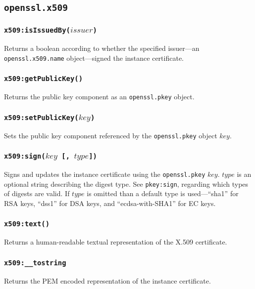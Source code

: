 \documentclass[11pt, oneside]{memoir}
\newcommand*{\fn}[1]{\texttt{#1}\xspace}
\newcommand*{\module}[1]{\texttt{#1}\xspace}
\newcounter{toccols}
\newenvironment{Module}[1]{
	\subsection{\texttt{#1}}
	\addtocontents{toc}{
		\protect\begin{multicols}{\value{toccols}}
	}
}{
	\addtocontents{toc}{\protect\end{multicols}}
}
\begin{document}
\begin{Module}{openssl.x509}
\subsubsection[\fn{x509:isIssuedBy}]{\fn{x509:isIssuedBy($issuer$)}}

Returns a boolean according to whether the specified issuer---an \module{openssl.x509.name} object---signed the instance certificate.

\subsubsection[\fn{x509:getPublicKey}]{\fn{x509:getPublicKey()}}

Returns the public key component as an \module{openssl.pkey} object.

\subsubsection[\fn{x509:setPublicKey}]{\fn{x509:setPublicKey($key$)}}

Sets the public key component referenced by the \module{openssl.pkey} object $key$.

\subsubsection[\fn{x509:sign}]{\fn{x509:sign($key$ [, $type$])}}

Signs and updates the instance certificate using the \module{openssl.pkey} $key$. $type$ is an optional string describing the digest type. See \module{pkey:sign}, regarding which types of digests are valid. If $type$ is omitted than a default type is used---``sha1'' for RSA keys, ``dss1'' for DSA keys, and ``ecdsa-with-SHA1'' for EC keys.

\subsubsection[\fn{x509:text}]{\fn{x509:text()}}

Returns a human-readable textual representation of the X.509 certificate.

\subsubsection[\fn{x509:\_\_tostring}]{\fn{x509:\_\_tostring}}

Returns the PEM encoded representation of the instance certificate.

\end{Module}
\end{document}
